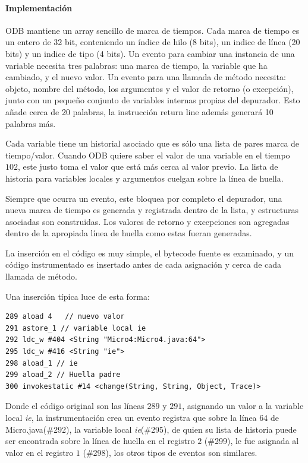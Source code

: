 \documentclass[12pt,legalpaper]{report}
\begin{document}
				\paragraph{Implementación}

ODB mantiene un array sencillo de marca de tiempos.  Cada marca de tiempo es un entero de 32 bit, conteniendo un índice de hilo (8 bits), un indice de línea (20 bits) y un indice de tipo (4 bits).  Un evento para cambiar una instancia de una variable necesita tres palabras: una marca de tiempo, la variable que ha cambiado, y el nuevo valor.  Un evento para una llamada de método necesita: objeto, nombre del método, los argumentos y el valor de retorno (o excepción), junto con un pequeño conjunto de variables internas propias del depurador.  Esto añade cerca de 20 palabras, la instrucción return line además generará 10 palabras más.

Cada variable tiene un historial asociado que es sólo una lista de pares marca de tiempo/valor. Cuando ODB quiere saber el valor de una variable en el tiempo $102$, este justo toma el valor que está más cerca al valor previo.  La lista de historia para variables locales y argumentos cuelgan sobre la línea de huella.

Siempre que ocurra un evento, este bloquea por completo el depurador, una nueva marca de tiempo es generada y registrada dentro de la lista, y estructuras asociadas son construidas.  Los valores de retorno y excepciones son agregadas dentro de la apropiada línea de huella como estas fueran generadas.

La inserción en el código es muy simple, el bytecode fuente es examinado, y un código instrumentado es insertado antes de cada asignación y cerca de cada llamada de método.

Una inserción típica luce de esta forma:

\begin{singlespace}
\begin{verbatim}
289 aload 4   // nuevo valor
291 astore_1 // variable local ie
292 ldc_w #404 <String "Micro4:Micro4.java:64">
295 ldc_w #416 <String "ie">
298 aload_1 // ie
299 aload_2 // Huella padre
300 invokestatic #14 <change(String, String, Object, Trace)>
\end{verbatim}
\end{singlespace}

Donde el código original son las líneas $289$ y $291$, asignando un valor a la variable local \textit{ie}, la instrumentación crea un evento registra que sobre la línea $64$ de Micro.java(\#292), la variable local \textit{ie}(\#295), de quien su lista de historia puede ser encontrada sobre la línea de huella en el registro $2$ (\#299), le fue asignada al valor en el registro $1$ (\#298), los otros tipos de eventos son similares.
\end{document}
